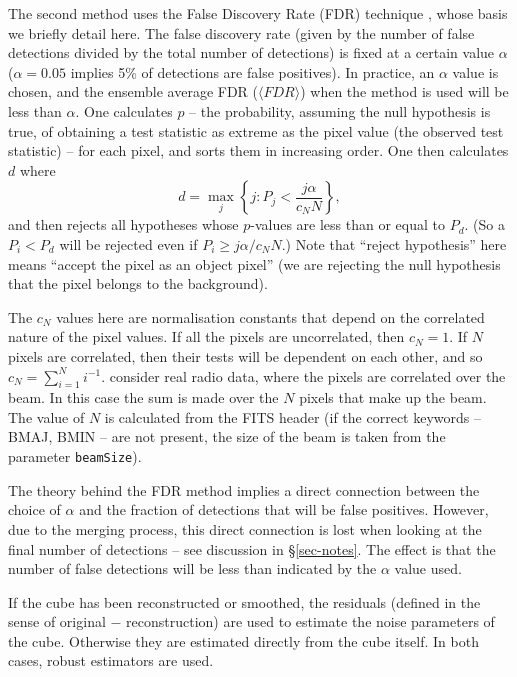 The second method uses the False Discovery Rate (FDR) technique
\citep{miller01,hopkins02}, whose basis we briefly detail here. The
false discovery rate (given by the number of false detections divided
by the total number of detections) is fixed at a certain value
$\alpha$ (\eg $\alpha=0.05$ implies 5\% of detections are false
positives). In practice, an $\alpha$ value is chosen, and the ensemble
average FDR (\ie $\langle FDR \rangle$) when the method is used will
be less than $\alpha$.  One calculates $p$ -- the probability,
assuming the null hypothesis is true, of obtaining a test statistic as
extreme as the pixel value (the observed test statistic) -- for each
pixel, and sorts them in increasing order. One then calculates $d$
where
\[
d = \max_j \left\{ j : P_j < \frac{j\alpha}{c_N N} \right\},
\]
and then rejects all hypotheses whose $p$-values are less than or
equal to $P_d$. (So a $P_i<P_d$ will be rejected even if $P_i \geq
j\alpha/c_N N$.) Note that ``reject hypothesis'' here means ``accept
the pixel as an object pixel'' (\ie we are rejecting the null
hypothesis that the pixel belongs to the background).

The $c_N$ values here are normalisation constants that depend on the
correlated nature of the pixel values. If all the pixels are
uncorrelated, then $c_N=1$. If $N$ pixels are correlated, then their
tests will be dependent on each other, and so $c_N = \sum_{i=1}^N
i^{-1}$. \citet{hopkins02} consider real radio data, where the pixels
are correlated over the beam. In this case the sum is made over the
$N$ pixels that make up the beam. The value of $N$ is calculated from
the FITS header (if the correct keywords -- BMAJ, BMIN -- are not
present, the size of the beam is taken from the parameter
\texttt{beamSize}). 

The theory behind the FDR method implies a direct connection between
the choice of $\alpha$ and the fraction of detections that will be
false positives. However, due to the merging process, this direct
connection is lost when looking at the final number of detections --
see discussion in \S\ref{sec-notes}. The effect is that the number of
false detections will be less than indicated by the $\alpha$ value
used.

If the cube has been reconstructed or smoothed, the residuals (defined
in the sense of original $-$ reconstruction) are used to estimate the
noise parameters of the cube. Otherwise they are estimated directly
from the cube itself. In both cases, robust estimators are used.

